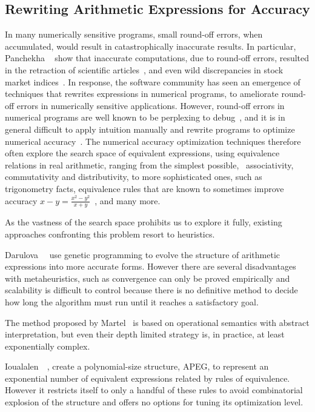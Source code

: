 
\subsection{Rewriting Arithmetic Expressions for Accuracy}
\label{bg:sub:expression_accuracy}

In many numerically sensitive programs, small round-off errors, when
accumulated, would result in catastrophically inaccurate results.  In
particular, Panchekha \etal~\cite{panchekha15} show that inaccurate
computations, due to round-off errors, resulted in the retraction of scientific
articles~\cite{altman99}, and even wild discrepancies in stock market
indices~\cite{mccullough99}.  In response, the software community has seen an
emergence of techniques that rewrites expressions in numerical programs, to
ameliorate round-off errors in numerically sensitive applications.  However,
round-off errors in numerical programs are well known to be perplexing to
debug~\cite{toronto14}, and it is in general difficult to apply intuition
manually and rewrite programs to optimize numerical accuracy~\cite{toronto14}.
The numerical accuracy optimization techniques therefore often explore the
search space of equivalent expressions, using equivalence relations in
real arithmetic, ranging from the simplest possible, \eg~associativity,
commutativity and distributivity, to more sophisticated ones, such as
trigonometry facts, equivalence rules that are known to sometimes improve
accuracy $x - y = \frac{x^2 - y^2}{x + y}$~\cite{panchekha15}, and many more.

As the vastness of the search space prohibits us to explore it fully, existing
approaches confronting this problem resort to heuristics.

Darulova~\etal~\cite{darulova} use genetic programming to evolve the structure
of arithmetic expressions into more accurate forms.  However there are several
disadvantages with metaheuristics, such as convergence can only be proved
empirically and scalability is difficult to control because there is no
definitive method to decide how long the algorithm must run until it reaches a
satisfactory goal.

The method proposed by Martel~\cite{martel07} is based on operational semantics
with abstract interpretation, but even their depth limited strategy is, in
practice, at least exponentially complex.

Ioualalen~\etal~\cite{ioualalen}, create a polynomial-size structure, APEG, to
represent an exponential number of equivalent expressions related by rules of
equivalence.  However it restricts itself to only a handful of these rules to
avoid combinatorial explosion of the structure and offers no options for tuning
its optimization level.

